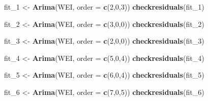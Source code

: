 \documentclass[]{article}
\newenvironment{Shaded}{\begin{snugshade}}{\end{snugshade}}
\newcommand{\KeywordTok}[1]{\textcolor[rgb]{0.13,0.29,0.53}{\textbf{#1}}}
\newcommand{\DataTypeTok}[1]{\textcolor[rgb]{0.13,0.29,0.53}{#1}}
\newcommand{\DecValTok}[1]{\textcolor[rgb]{0.00,0.00,0.81}{#1}}
\newcommand{\StringTok}[1]{\textcolor[rgb]{0.31,0.60,0.02}{#1}}
\newcommand{\NormalTok}[1]{#1}
\begin{document}
\begin{Shaded}
\begin{Highlighting}[]
\NormalTok{fit_}\DecValTok{1}\NormalTok{ <-}\StringTok{ }\KeywordTok{Arima}\NormalTok{(WEI, }\DataTypeTok{order =} \KeywordTok{c}\NormalTok{(}\DecValTok{2}\NormalTok{,}\DecValTok{0}\NormalTok{,}\DecValTok{3}\NormalTok{)) }
\KeywordTok{checkresiduals}\NormalTok{(fit_}\DecValTok{1}\NormalTok{)}

\NormalTok{fit_}\DecValTok{2}\NormalTok{ <-}\StringTok{ }\KeywordTok{Arima}\NormalTok{(WEI, }\DataTypeTok{order =} \KeywordTok{c}\NormalTok{(}\DecValTok{3}\NormalTok{,}\DecValTok{0}\NormalTok{,}\DecValTok{0}\NormalTok{))}
\KeywordTok{checkresiduals}\NormalTok{(fit_}\DecValTok{2}\NormalTok{)}

\NormalTok{fit_}\DecValTok{3}\NormalTok{ <-}\StringTok{ }\KeywordTok{Arima}\NormalTok{(WEI, }\DataTypeTok{order =} \KeywordTok{c}\NormalTok{(}\DecValTok{2}\NormalTok{,}\DecValTok{0}\NormalTok{,}\DecValTok{0}\NormalTok{))}
\KeywordTok{checkresiduals}\NormalTok{(fit_}\DecValTok{3}\NormalTok{)}

\NormalTok{fit_}\DecValTok{4}\NormalTok{ <-}\StringTok{ }\KeywordTok{Arima}\NormalTok{(WEI, }\DataTypeTok{order =} \KeywordTok{c}\NormalTok{(}\DecValTok{5}\NormalTok{,}\DecValTok{0}\NormalTok{,}\DecValTok{4}\NormalTok{))}
\KeywordTok{checkresiduals}\NormalTok{(fit_}\DecValTok{4}\NormalTok{)}

\NormalTok{fit_}\DecValTok{5}\NormalTok{ <-}\StringTok{ }\KeywordTok{Arima}\NormalTok{(WEI, }\DataTypeTok{order =} \KeywordTok{c}\NormalTok{(}\DecValTok{6}\NormalTok{,}\DecValTok{0}\NormalTok{,}\DecValTok{4}\NormalTok{))}
\KeywordTok{checkresiduals}\NormalTok{(fit_}\DecValTok{5}\NormalTok{)}

\NormalTok{fit_}\DecValTok{6}\NormalTok{ <-}\StringTok{ }\KeywordTok{Arima}\NormalTok{(WEI, }\DataTypeTok{order =} \KeywordTok{c}\NormalTok{(}\DecValTok{7}\NormalTok{,}\DecValTok{0}\NormalTok{,}\DecValTok{5}\NormalTok{))}
\KeywordTok{checkresiduals}\NormalTok{(fit_}\DecValTok{6}\NormalTok{)}


\end{Highlighting}
\end{Shaded}
\end{document}

